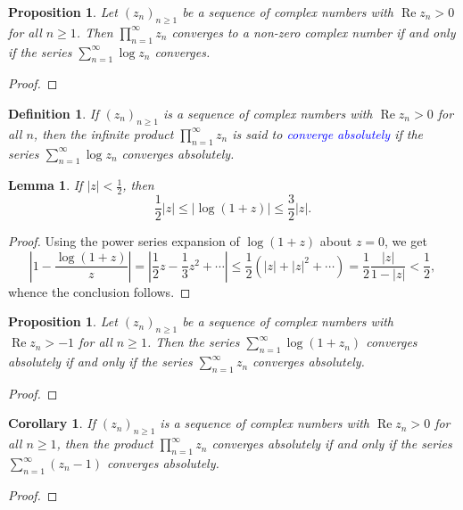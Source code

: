 \documentclass[11pt]{article}
\theoremstyle{thmstyle}
\newtheorem{lemma}[theorem]{Lemma}
\newtheorem{proposition}[theorem]{Proposition}
\theoremstyle{defstyle}
\newtheorem{definition}[theorem]{Definition}
\newtheorem{corollary}[theorem]{Corollary}
\newcommand{\define}[1]{\textcolor{blue}{\textit{#1}}}
\renewcommand{\le}{\leqslant}
\renewcommand{\ge}{\geqslant}
\renewcommand{\Re}{\operatorname{Re}}
\begin{document}
\begin{proposition}
    Let $(z_n)_{n\ge 1}$ be a sequence of complex numbers with $\Re z_n > 0$ for all $n\ge 1$. Then $\displaystyle\prod_{n = 1}^\infty z_n$ converges to a \emph{non-zero} complex number if and only if the series $\displaystyle\sum_{n = 1}^\infty\log z_n$ converges.
\end{proposition}
\begin{proof}
\end{proof}

\begin{definition}
    If $(z_n)_{n\ge 1}$ is a sequence of complex numbers with $\Re z_n > 0$ for all $n$, then the infinite product $\displaystyle\prod_{n = 1}^\infty z_n$ is said to \define{converge absolutely} if the series $\displaystyle\sum_{n = 1}^\infty\log z_n$ converges absolutely.
\end{definition}

\begin{lemma}
    If $|z| < \frac{1}{2}$, then 
    \begin{equation*}
        \frac{1}{2}|z|\le |\log (1 + z)|\le\frac{3}{2}|z|.
    \end{equation*}
\end{lemma}
\begin{proof}
    Using the power series expansion of $\log(1 + z)$ about $z = 0$, we get 
    \begin{equation*}
        \left|1 - \frac{\log(1 + z)}{z}\right| = \left|\frac{1}{2}z - \frac{1}{3}z^2 + \cdots\right|\le\frac{1}{2}\left(|z| + |z|^2 + \cdots\right) = \frac{1}{2}\frac{|z|}{1 - |z|} < \frac{1}{2},
    \end{equation*}
    whence the conclusion follows.
\end{proof}

\begin{proposition}
    Let $(z_n)_{n\ge 1}$ be a sequence of complex numbers with $\Re z_n > - 1$ for all $n\ge 1$. Then the series $\displaystyle\sum_{n = 1}^\infty\log(1 + z_n)$ converges absolutely if and only if the series $\displaystyle\sum_{n = 1}^\infty z_n$ converges absolutely.
\end{proposition}
\begin{proof}
\end{proof}

\begin{corollary}
    If $(z_n)_{n\ge 1}$ is a sequence of complex numbers with $\Re z_n > 0$ for all $n\ge 1$, then the product $\displaystyle\prod_{n = 1}^\infty z_n$ converges absolutely if and only if the series $\displaystyle\sum_{n = 1}^\infty (z_n - 1)$ converges absolutely.
\end{corollary}
\begin{proof}
\end{proof}
\end{document}
